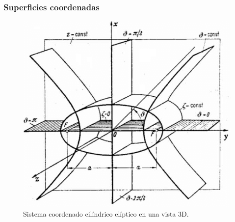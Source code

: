 \documentclass[12pt]{beamer}
\begin{document}
\begin{frame}
\frametitle{Superficies coordenadas}
\begin{figure}[H]
    \centering
    \includegraphics[scale=0.3]{Imagenes/Elliptic-cylindrical-coordinates_02.png}
    \caption{Sistema coordenado cilíndrico elíptico en una vista 3D.}
    \label{fig:figura_coordenada_cilindricas_elipticas_3D}
\end{figure}
\end{frame}
\end{document}
